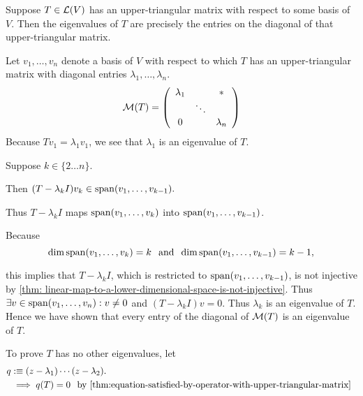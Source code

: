 \begin{thm}
  \label{thm:determination-of-eigenvalue-from-upper-triangular-matrix}
  Suppose $T\in \mathcal{L}(V)$ has an upper-triangular matrix with respect to some basis of $V$. Then the eigenvalues of $T$ are precisely the entries on the diagonal of that upper-triangular matrix.

\end{thm}
\begin{prf}
  Let $v_1, \ldots, v_n$ denote a basis of $V$ with respect to which $T$ has an upper-triangular matrix with diagonal entries $\lambda_1, \ldots, \lambda_n$.
  \begin{equation}
    \mathcal{M}(T) =
    \left( {\begin{array}{ccc}
        \lambda_1 &         &  * \\
                  &  \ddots &    \\
           0      &         & \lambda_n
    \end{array} } \right)
  \end{equation}  
  Because $T v_1 = \lambda_1 v_1$, we see that $\lambda_1$ is an eigenvalue of $T$.
  
  Suppose $k \in \{2 \ldots n\}.$ 
  
  Then $(T-\lambda_k I) v_k \in \operatorname{span} (v_1, \ldots, v_{k-1}).$ 
  
  Thus $T-\lambda_k I$ maps $\operatorname{span} (v_1, \ldots, v_k)$ into $\operatorname{span} (v_1, \ldots, v_{k-1})$.
  
  Because
  \begin{equation}
    \dim \operatorname{span} (v_1, \ldots, v_k) = k \;\;\, \text{and}\;\; \dim \operatorname{span} (v_1, \ldots, v_{k-1}) = k-1,
  \end{equation}
  
  this implies that $T-\lambda_k I$, which is restricted to $\operatorname{span} (v_1, \ldots, v_{k-1})$, is not injective by \autoref{thm: linear-map-to-a-lower-dimensional-space-is-not-injective}. Thus $\exists v \in \operatorname{span} (v_1, \ldots, v_n): v\neq0$ and $(T-\lambda_k I)v=0$. Thus $\lambda_k$ is an eigenvalue of $T$. Hence we have shown that every entry of the diagonal of $\mathcal{M}(T)$ is an eigenvalue of $T$.
  
  To prove $T$ has no other eigenvalues, let
  \begin{equation}
    \begin{aligned}
      q &:\equiv (z-\lambda_1) \cdots (z-\lambda_2). \\
      &\implies q(T) = 0 \mytext{by \autoref{thm:equation-satisfied-by-operator-with-upper-triangular-matrix}}
    \end{aligned}
  \end{equation}
  

\end{prf}
